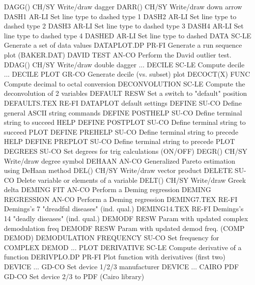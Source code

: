 DAGG()                      CH/SY Write/draw dagger
DARR()                      CH/SY Write/draw down arrow
DASH1                       AR-LI Set line type to dashed type 1
DASH2                       AR-LI Set line type to dashed type 2
DASH3                       AR-LI Set line type to dashed type 3
DASH4                       AR-LI Set line type to dashed type 4
DASHED                      AR-LI Set line type to dashed
DATA                        SC-LE Generate a set of data values
DATAPLOT.DP                 PR-FI Generate a run sequence plot (BAKER.DAT)
DAVID TEST                  AN-CO Perform the David outlier test.
DDAG()                      CH/SY Write/draw double dagger
... DECILE                  SC-LE Compute decile
... DECILE PLOT             GR-CO Generate decile (vs. subset) plot
DECOCT(X)                   FUNC  Compute decimal to octal conversion
DECONVOLUTION               SC-LE Compute the deconvolution of 2 variables
DEFAULT                     RESW  Set a switch to "default" position
DEFAULTS.TEX                RE-FI DATAPLOT default settings
DEFINE                      SU-CO Define general ASCII string commands
DEFINE POSTHELP             SU-CO Define terminal string to succeed HELP
DEFINE POSTPLOT             SU-CO Define terminal string to succeed PLOT
DEFINE PREHELP              SU-CO Define terminal string to precede HELP
DEFINE PREPLOT              SU-CO Define terminal string to precede PLOT
DEGREES                     SU-CO Set degrees for trig calculations (ON/OFF)
DEGR()                      CH/SY Write/draw degree symbol
DEHAAN                      AN-CO Generalized Pareto estimation using DeHaan method
DEL()                       CH/SY Write/draw vector product
DELETE                      SU-CO Delete variable or elements of a variable
DELT()                      CH/SY Write/draw Greek delta
DEMING FIT                  AN-CO Perform a Deming regression
DEMING REGRESSION           AN-CO Perform a Deming regression
DEMING7.TEX                 RE-FI Demings's 7 "dreadful diseases" (ind. qual.)
DEMING14.TEX                RE-FI Demings's 14 "deadly diseases" (ind. qual.)
DEMODF                      RESW  Param with updated complex demodulation freq
DEMODF                      RESW  Param with updated demod freq. (COMP DEMOD)
DEMODULATION FREQUENCY      SU-CO Set frequency for COMPLEX DEMOD ... PLOT
DERIVATIVE                  SC-LE Compute derivative of a function
DERIVPLO.DP                 PR-FI Plot function with derivatives (first two)
DEVICE ...                  GD-CO Set device 1/2/3 manufacturer
DEVICE ... CAIRO PDF        GD-CO Set device 2/3 to PDF (Cairo library)
